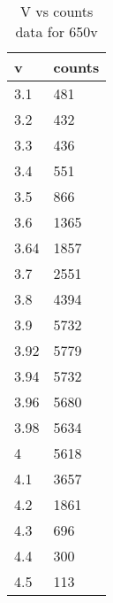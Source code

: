 \begin{table}[H]
    \centering
    \begin{tabular}{|l|l|}
    \hline
        v & counts \\ \hline
        3.1 & 481 \\ \hline
        3.2 & 432 \\ \hline
        3.3 & 436 \\ \hline
        3.4 & 551 \\ \hline
        3.5 & 866 \\ \hline
        3.6 & 1365 \\ \hline
        3.64 & 1857 \\ \hline
        3.7 & 2551 \\ \hline
        3.8 & 4394 \\ \hline
        3.9 & 5732 \\ \hline
        3.92 & 5779 \\ \hline
        3.94 & 5732 \\ \hline
        3.96 & 5680 \\ \hline
        3.98 & 5634 \\ \hline
        4 & 5618 \\ \hline
        4.1 & 3657 \\ \hline
        4.2 & 1861 \\ \hline
        4.3 & 696 \\ \hline
        4.4 & 300 \\ \hline
        4.5 & 113 \\ \hline
    \end{tabular}
    \caption{V vs counts data for 650v}
    \label{tab:650}
\end{table}
